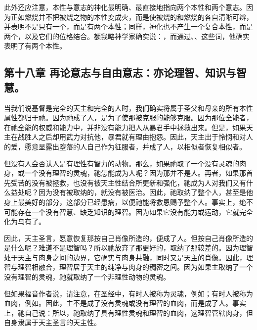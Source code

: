此外还应注意，本性与意志的神化最明确、最直接地指向两个本性和两个意志。因为正如燃烧并不把被烧之物的本性变成火，而是使被烧的和燃烧的各自清晰可辨，并表明不是只有一个，而是有两个本性；同样，神化也不产生一个复合本性，而是两个，以及它们的位格结合。额我略神学家确实说：，而通过、、这些词，他确实表明了有两个本性。\par


\subsection{第十八章 再论意志与自由意志：亦论理智、知识与智慧。}

当我们说基督是完全的天主和完全的人时，我们确实将属于圣父和母亲的所有本性属性都归于祂。因为祂成了人，是为了使那被克服的能够克服。因为那位全能者，在祂全能的权威和能力中，并非没有能力把人从暴君手中拯救出来。但是，如果天主在战胜人之后却用武力对抗他，暴君就有理由抱怨。因此，天主出于怜悯和对人的爱，愿意显露出堕落的人自己作为征服者，并成了人，以相似者恢复相似者。\par

但没有人会否认人是有理性有智力的动物。那么，如果祂取了一个没有灵魂的肉身，或一个没有理智的灵魂，祂怎能成为人呢？因为那并不是人。再者，如果那首先受苦的没有被拯救，也没有被天主性结合所更新和强化，祂成为人对我们又有什么益处呢？因为没有被取纳的，就没有被医治。因此，祂取纳了整个人，甚至是他身上最美好的部分，这部分已经患病，以便祂能将救恩赐予整个人。事实上，绝不可能存在一个没有智慧、缺乏知识的理智。因为如果它没有能力或运动，它就完全化为乌有了。\par

因此，天主圣言，愿意恢复那按自己肖像所造的，便成了人。但按自己肖像所造的是什么呢？难道不是理智吗？所以祂放弃了那更好的，取纳了那较差的。因为理智处于天主与肉身之间的边界，它确实与肉身共融，同时又是天主的肖像。因此，理智与理智相融合，理智居于天主的纯净与肉身的稠密之间。因为如果主取纳了一个没有理智的灵魂，祂就取纳了一个非理性动物的灵魂。\par

但如果福音作者说，请注意，在圣经中，有时人被称为灵魂，例如；有时人被称为血肉，例如。因此，主不是成了没有灵魂或没有理智的血肉，而是成了人。事实上，祂自己说：所以，祂取纳了具有理性灵魂和理智的血肉，这理智管辖肉身，但自身隶属于天主圣言的天主性。\par

